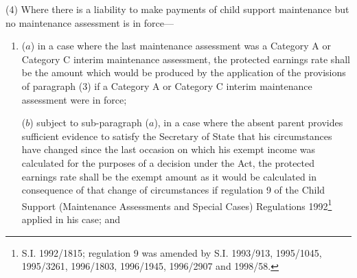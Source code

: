 \documentclass[12pt,a4paper]{article}
\begin{document}
{%
%
%

(4) Where there is a liability to make payments of child support maintenance but no maintenance assessment is in force—
\begin{enumerate}\item[]
($a$) in a case where the last maintenance assessment was a Category A or Category C interim maintenance assessment, the protected earnings rate shall be the amount which would be produced by the application of the provisions of paragraph (3) if a Category A or Category C interim maintenance assessment were in force;

($b$) subject to sub-paragraph ($a$), in a case where the absent parent provides sufficient evidence to satisfy the Secretary of State that his circumstances have changed since the last occasion on which his exempt income was calculated for the purposes of a decision under the Act, the protected earnings rate shall be the exempt amount as it would be calculated in consequence of that change of circumstances if regulation 9 of the Child Support (Maintenance Assessments and Special Cases) Regulations 1992\footnote{\frenchspacing S.I. 1992/1815; regulation 9 was amended by S.I. 1993/913, 1995/1045, 1995/3261, 1996/1803, 1996/1945, 1996/2907 and 1998/58.} applied in his case; and


\end{enumerate}}
\end{document}
